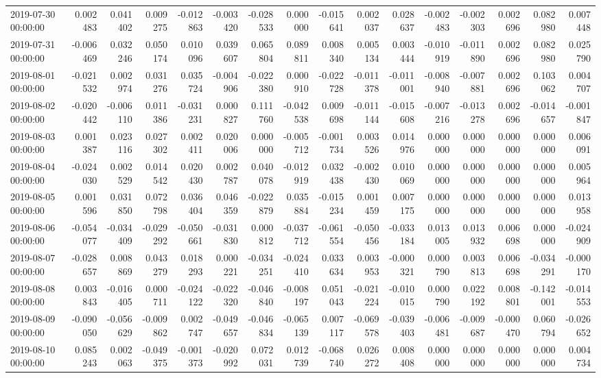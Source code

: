 \begin{tabular}{lrrrrrrrrrrrrrrr}
2019-07-30 00:00:00 & 0.002483 & 0.041402 & 0.009275 & -0.012863 & -0.003420 & -0.028533 & 0.000000 & -0.015641 & 0.002037 & 0.028637 & -0.002483 & -0.002303 & 0.002696 & 0.082980 & 0.007448 \\
2019-07-31 00:00:00 & -0.006469 & 0.032246 & 0.050174 & 0.010096 & 0.039607 & 0.065804 & 0.089811 & 0.008340 & 0.005134 & 0.003444 & -0.010919 & -0.011890 & 0.002696 & 0.082980 & 0.025790 \\
2019-08-01 00:00:00 & -0.021532 & 0.002974 & 0.031276 & 0.035724 & -0.004906 & -0.022380 & 0.000910 & -0.022728 & -0.011378 & -0.011001 & -0.008940 & -0.007881 & 0.002696 & 0.103062 & 0.004707 \\
2019-08-02 00:00:00 & -0.020442 & -0.006110 & 0.011386 & -0.031231 & 0.000827 & 0.111760 & -0.042538 & 0.009698 & -0.011144 & -0.015608 & -0.007216 & -0.013278 & 0.002696 & -0.014657 & -0.001847 \\
2019-08-03 00:00:00 & 0.001387 & 0.023116 & 0.027302 & 0.002411 & 0.020006 & 0.000000 & -0.005712 & -0.001734 & 0.003526 & 0.014976 & 0.000000 & 0.000000 & 0.000000 & 0.000000 & 0.006091 \\
2019-08-04 00:00:00 & -0.024030 & 0.002529 & 0.014542 & 0.020430 & 0.002787 & 0.040078 & -0.012919 & 0.032438 & -0.002430 & 0.010069 & 0.000000 & 0.000000 & 0.000000 & 0.000000 & 0.005964 \\
2019-08-05 00:00:00 & 0.001596 & 0.031850 & 0.072798 & 0.036404 & 0.046359 & -0.022879 & 0.035884 & -0.015234 & 0.001459 & 0.007175 & 0.000000 & 0.000000 & 0.000000 & 0.000000 & 0.013958 \\
2019-08-06 00:00:00 & -0.054077 & -0.034409 & -0.029292 & -0.050661 & -0.031830 & 0.000812 & -0.037712 & -0.061554 & -0.050456 & -0.033184 & 0.013005 & 0.013932 & 0.006698 & 0.000000 & -0.024909 \\
2019-08-07 00:00:00 & -0.028657 & 0.008869 & 0.043279 & 0.018293 & 0.000221 & -0.034251 & -0.024410 & 0.033634 & 0.003953 & -0.000321 & 0.000790 & 0.003813 & 0.006698 & -0.034291 & -0.000170 \\
2019-08-08 00:00:00 & 0.003843 & -0.016405 & 0.000711 & -0.024122 & -0.022320 & -0.046840 & -0.008197 & 0.051043 & -0.021224 & -0.010015 & 0.000790 & 0.022192 & 0.008801 & -0.142001 & -0.014553 \\
2019-08-09 00:00:00 & -0.090050 & -0.056629 & -0.009862 & 0.002747 & -0.049657 & -0.046834 & -0.065139 & 0.007117 & -0.069578 & -0.039403 & -0.006481 & -0.009687 & -0.000470 & 0.060794 & -0.026652 \\
2019-08-10 00:00:00 & 0.085243 & 0.002063 & -0.049375 & -0.001373 & -0.020992 & 0.072031 & 0.012739 & -0.068740 & 0.026272 & 0.008408 & 0.000000 & 0.000000 & 0.000000 & 0.000000 & 0.004734 \\

\end{tabular}
